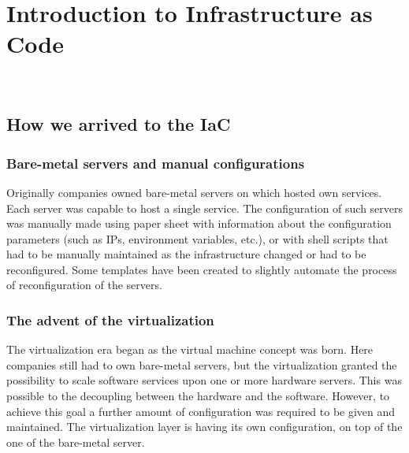 
\chapter{Introduction to Infrastructure as Code}
\label{cap:introduction-to-iac}

\\



\section{How we arrived to the IaC}
\label{sec:story-iac}

\subsection{Bare-metal servers and manual configurations}
Originally companies owned bare-metal servers on which hosted own services.
Each server was capable to host a single service.
The configuration of such servers was manually made using paper sheet with information about the configuration parameters (such as IPs, environment variables, etc.), or with shell scripts that had to be manually maintained as the infrastructure changed or had to be reconfigured.
Some templates have been created to slightly automate the process of reconfiguration of the servers.\\

\subsection{The advent of the virtualization}
The virtualization era began as the virtual machine concept was born.
Here companies still had to own bare-metal servers, but the virtualization granted the possibility to scale software services upon one or more hardware servers.
This was possible to the decoupling between the hardware and the software.
However, to achieve this goal a further amount of configuration was required to be given and maintained.
The virtualization layer is having its own configuration, on top of the one of the bare-metal server.\\

